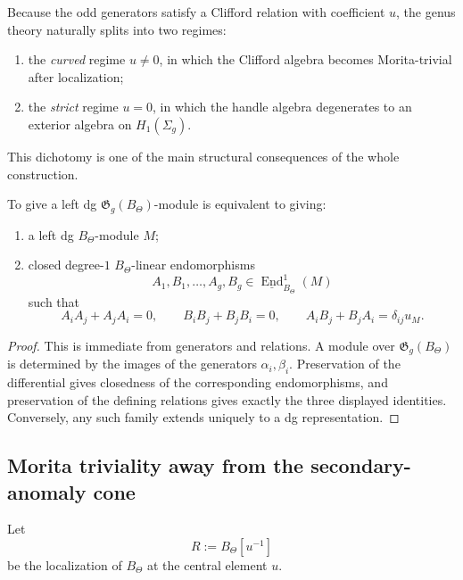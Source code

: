 \begin{remark}
Because the odd generators satisfy a Clifford relation with coefficient \(u\), the genus theory naturally splits into two regimes:
\begin{enumerate}
\item the \emph{curved} regime \(u\neq 0\), in which the Clifford algebra becomes Morita-trivial after localization;
\item the \emph{strict} regime \(u=0\), in which the handle algebra degenerates to an exterior algebra on \(H_{1}(\Sigma_{g})\).
\end{enumerate}
This dichotomy is one of the main structural consequences of the whole construction.
\end{remark}

\begin{theorem}
To give a left dg \(\mathfrak{G}_{g}(B_{\Theta})\)-module is equivalent to giving:
\begin{enumerate}
\item a left dg \(B_{\Theta}\)-module \(M\);
\item closed degree-\(1\) \(B_{\Theta}\)-linear endomorphisms
\[
A_{1},B_{1},\dots,A_{g},B_{g}\in \underline{\operatorname{End}}^{1}_{B_{\Theta}}(M)
\]
such that
\[
A_{i}A_{j}+A_{j}A_{i}=0,\qquad
B_{i}B_{j}+B_{j}B_{i}=0,\qquad
A_{i}B_{j}+B_{j}A_{i}=\delta_{ij}u_{M}.
\]
\end{enumerate}
\end{theorem}

\begin{proof}
This is immediate from generators and relations.
A module over \(\mathfrak{G}_{g}(B_{\Theta})\) is determined by the images of the generators
\(\alpha_{i},\beta_{i}\).
Preservation of the differential gives closedness of the corresponding endomorphisms, and preservation of the defining relations gives exactly the three displayed identities.
Conversely, any such family extends uniquely to a dg representation.
\end{proof}

\subsection{Morita triviality away from the secondary-anomaly cone}

Let
\[
R:=B_{\Theta}[u^{-1}]
\]
be the localization of \(B_{\Theta}\) at the central element \(u\).

